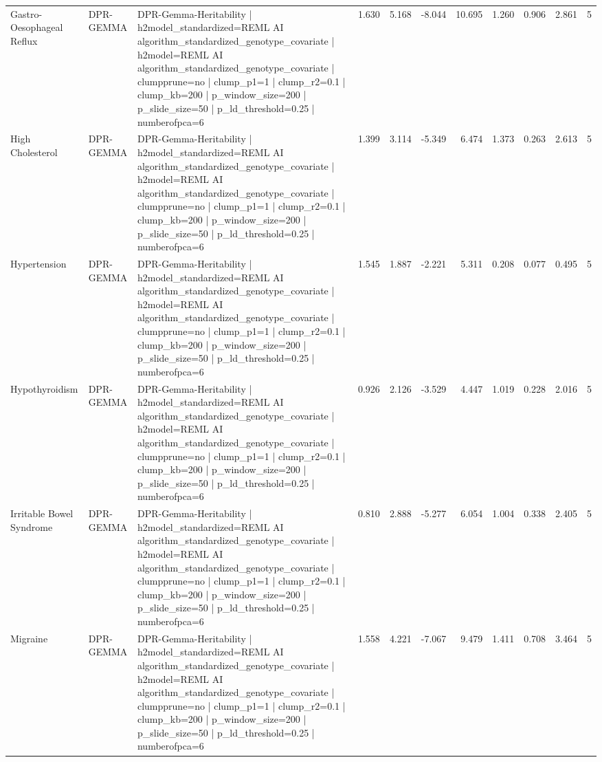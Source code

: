 \begin{landscape}
\begin{longtable}{p{2.4cm}p{1.8cm}p{6.0cm}rrrrrrrr}
Gastro-Oesophageal Reflux & DPR-GEMMA & DPR-Gemma-Heritability | h2model\_standardized=REML AI algorithm\_standardized\_genotype\_covariate | h2model=REML AI algorithm\_standardized\_genotype\_covariate | clumpprune=no | clump\_p1=1 | clump\_r2=0.1 | clump\_kb=200 | p\_window\_size=200 | p\_slide\_size=50 | p\_ld\_threshold=0.25 | numberofpca=6 & 1.630 & 5.168 & -8.044 & 10.695 & 1.260 & 0.906 & 2.861 & 5 \\
High Cholesterol & DPR-GEMMA & DPR-Gemma-Heritability | h2model\_standardized=REML AI algorithm\_standardized\_genotype\_covariate | h2model=REML AI algorithm\_standardized\_genotype\_covariate | clumpprune=no | clump\_p1=1 | clump\_r2=0.1 | clump\_kb=200 | p\_window\_size=200 | p\_slide\_size=50 | p\_ld\_threshold=0.25 | numberofpca=6 & 1.399 & 3.114 & -5.349 & 6.474 & 1.373 & 0.263 & 2.613 & 5 \\
Hypertension & DPR-GEMMA & DPR-Gemma-Heritability | h2model\_standardized=REML AI algorithm\_standardized\_genotype\_covariate | h2model=REML AI algorithm\_standardized\_genotype\_covariate | clumpprune=no | clump\_p1=1 | clump\_r2=0.1 | clump\_kb=200 | p\_window\_size=200 | p\_slide\_size=50 | p\_ld\_threshold=0.25 | numberofpca=6 & 1.545 & 1.887 & -2.221 & 5.311 & 0.208 & 0.077 & 0.495 & 5 \\
Hypothyroidism & DPR-GEMMA & DPR-Gemma-Heritability | h2model\_standardized=REML AI algorithm\_standardized\_genotype\_covariate | h2model=REML AI algorithm\_standardized\_genotype\_covariate | clumpprune=no | clump\_p1=1 | clump\_r2=0.1 | clump\_kb=200 | p\_window\_size=200 | p\_slide\_size=50 | p\_ld\_threshold=0.25 | numberofpca=6 & 0.926 & 2.126 & -3.529 & 4.447 & 1.019 & 0.228 & 2.016 & 5 \\
Irritable Bowel Syndrome & DPR-GEMMA & DPR-Gemma-Heritability | h2model\_standardized=REML AI algorithm\_standardized\_genotype\_covariate | h2model=REML AI algorithm\_standardized\_genotype\_covariate | clumpprune=no | clump\_p1=1 | clump\_r2=0.1 | clump\_kb=200 | p\_window\_size=200 | p\_slide\_size=50 | p\_ld\_threshold=0.25 | numberofpca=6 & 0.810 & 2.888 & -5.277 & 6.054 & 1.004 & 0.338 & 2.405 & 5 \\
Migraine & DPR-GEMMA & DPR-Gemma-Heritability | h2model\_standardized=REML AI algorithm\_standardized\_genotype\_covariate | h2model=REML AI algorithm\_standardized\_genotype\_covariate | clumpprune=no | clump\_p1=1 | clump\_r2=0.1 | clump\_kb=200 | p\_window\_size=200 | p\_slide\_size=50 | p\_ld\_threshold=0.25 | numberofpca=6 & 1.558 & 4.221 & -7.067 & 9.479 & 1.411 & 0.708 & 3.464 & 5 \\

\end{longtable}
\end{landscape}
